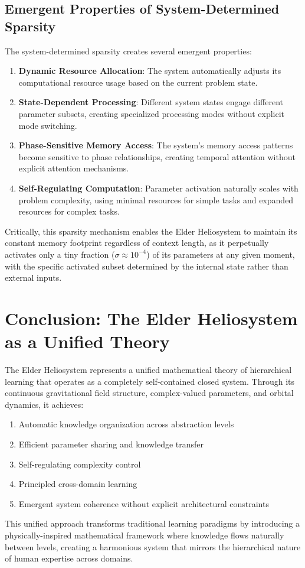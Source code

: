 \subsection{Emergent Properties of System-Determined Sparsity}

The system-determined sparsity creates several emergent properties:

\begin{enumerate}
    \item \textbf{Dynamic Resource Allocation}: The system automatically adjusts its computational resource usage based on the current problem state.
    
    \item \textbf{State-Dependent Processing}: Different system states engage different parameter subsets, creating specialized processing modes without explicit mode switching.
    
    \item \textbf{Phase-Sensitive Memory Access}: The system's memory access patterns become sensitive to phase relationships, creating temporal attention without explicit attention mechanisms.
    
    \item \textbf{Self-Regulating Computation}: Parameter activation naturally scales with problem complexity, using minimal resources for simple tasks and expanded resources for complex tasks.
\end{enumerate}

Critically, this sparsity mechanism enables the Elder Heliosystem to maintain its constant memory footprint regardless of context length, as it perpetually activates only a tiny fraction ($\sigma \approx 10^{-4}$) of its parameters at any given moment, with the specific activated subset determined by the internal state rather than external inputs.

\section{Conclusion: The Elder Heliosystem as a Unified Theory}

The Elder Heliosystem represents a unified mathematical theory of hierarchical learning that operates as a completely self-contained closed system. Through its continuous gravitational field structure, complex-valued parameters, and orbital dynamics, it achieves:

\begin{enumerate}
    \item Automatic knowledge organization across abstraction levels
    \item Efficient parameter sharing and knowledge transfer
    \item Self-regulating complexity control
    \item Principled cross-domain learning
    \item Emergent system coherence without explicit architectural constraints
\end{enumerate}

This unified approach transforms traditional learning paradigms by introducing a physically-inspired mathematical framework where knowledge flows naturally between levels, creating a harmonious system that mirrors the hierarchical nature of human expertise across domains.